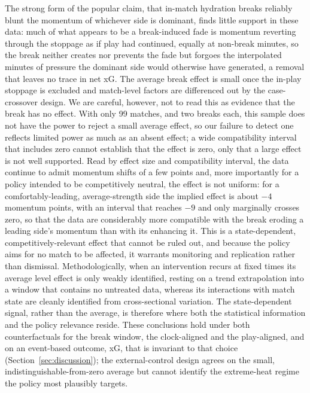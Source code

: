 \documentclass[11pt]{article}
\begin{document}
The strong form of the popular claim, that in-match hydration breaks reliably blunt the momentum of whichever
side is dominant, finds little support in these data: much of what appears to be a break-induced fade is
momentum reverting through the stoppage as if play had continued, equally at non-break minutes, so the break
neither creates nor prevents the fade but forgoes the interpolated minutes of pressure the dominant side would
otherwise have generated, a removal that leaves no trace in net xG. The average break effect is small once the
in-play stoppage is excluded and match-level factors are differenced out by the case-crossover design. We are careful,
however, not to read this as evidence that the break has no effect. With only 99 matches, and two breaks each,
this sample does not have the power to reject a small average effect, so our failure to detect one reflects
limited power as much as an absent effect; a wide compatibility interval that includes zero cannot
establish that the effect is zero, only that a large effect is not well supported. Read by effect size and
compatibility interval, the data continue to admit momentum shifts of a few points and, more importantly for a policy
intended to be competitively neutral, the effect is not uniform: for a comfortably-leading, average-strength
side the implied effect is about $-4$ momentum points, with an interval that reaches $-9$ and only marginally
crosses zero, so that the data are considerably more compatible with the break eroding a leading side's
momentum than with its enhancing it. This is a state-dependent, competitively-relevant effect that cannot be
ruled out, and because the policy aims for no match to be affected, it warrants monitoring and replication
rather than dismissal. Methodologically, when an intervention recurs at fixed times its average level effect
is only weakly identified, resting on a trend extrapolation into a window that contains no untreated data,
whereas its interactions with match state are cleanly identified from cross-sectional variation. The
state-dependent signal, rather than the average, is therefore where both the statistical information and the
policy relevance reside. These conclusions hold under both counterfactuals for the break window, the
clock-aligned and the play-aligned, and on an event-based outcome, xG, that is invariant to that choice
(Section~\ref{sec:discussion}); the external-control design agrees on the small, indistinguishable-from-zero average but cannot identify the
extreme-heat regime the policy most plausibly targets.
\end{document}
